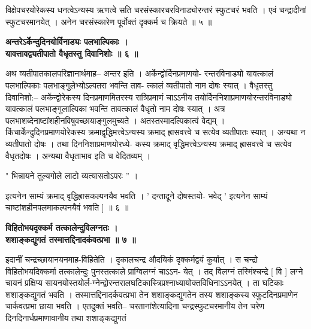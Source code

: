 \documentclass[11pt, openany]{book}
\begin{document}
{{{{\newpage
\thispagestyle{fancy}
\fancyhf{}
\rhead{[संकीर्णाधिकारः]}
\justifying
\noindent
विक्षेपचरयोरेकस्य धनत्वेऽन्यस्य ऋणत्वे सति चरसंस्कारचरविनाड्योरन्तरं
स्फुटचरं
भवति । एवं चन्द्रादीनां स्फुटचरमानयेत् । अनेन चरसंस्कारेण
पूर्वोक्तं
दृक्कर्म च क्रियते ॥ ५ ॥

\vspace{2mm}
\centering
\hspace{-0.7cm}
\textbf{
 अन्तरेऽर्केन्दुदिनयोर्विनाड्यः पलभाल्पिकाः ।\\
 यावत्तावद्व्यतीपातो वैधृतस्तु दिवानिशोः ॥ ६ ॥}
 
\vspace{2mm}
\justifying
 अथ व्यतीपातकालपरिज्ञानार्थमाह-- अन्तर इति ।
अर्केन्द्वोर्दिनप्रमाणयो-
रन्तरविनाड्यो यावत्कालं पलभाल्पिकाः पलभाङ्गुलेभ्योऽल्पतरा भवन्ति ताव-
त्कालं व्यतीपातो नाम दोषः स्यात् । वैधृतस्तु दिवानिशो:--
अर्केन्द्वोरेकस्य
दिनप्रमाणमितरस्य रात्रिप्रमाणं चाऽऽनीय
तयोर्दिननिशाप्रमाणयोरन्तरविनाड्यो
यावत्कालं पलभाङ्गुलाल्पिका भवन्ति तावत्कालं वैधृतो नाम दोषः स्यात् ।
अत्र पलभाशब्देनाष्टांशहीनविषुवच्छायाङ्गुलमुच्यते ।
अतस्तस्मादल्पिकात्वं वेद्यम् ।
किंचार्केन्दुदिनप्रमाणयोरेकस्य क्रमाद्वृद्धिमत्त्वेऽन्यस्य क्रमाद्
ह्रासवत्त्वे च सत्येव
व्यतीपातः स्यात् । अन्यथा न व्यतीपातो दोषः । तथा
दिननिशाप्रमाणयोरध्ये-
कस्य क्रमाद् वृद्धिमत्त्वेऽन्यस्य क्रमाद् ह्रासवत्त्वे च सत्येव
वैधृतदोषः । अन्यथा
वैधृताभाव इति च वेदितव्यम् ।

\vspace{2mm}
\centering
 " भिन्नायने तुल्यगोले लाटो व्यत्यासतोऽपरः '' ।

\vspace{2mm}
\justifying
 इत्यनेन साम्यं क्रमाद् वृद्धिह्रासकल्पनयैव भवति । ' दन्तादूने
दोषस्तयो-
भवेद् ' इत्यनेन साम्यं चाष्टांशहीनपलमाकल्पनयैवं भवति ] ॥ ६ ॥

\vspace{2mm}
\centering
\hspace{-0.9cm}
\textbf{
 विहितोभयदृक्कर्म तत्कालेन्दुविलग्नतः ।\\
 शशाङ्कद्युगतं तस्मात्तद्दिनादकंवत्प्रभा ॥ ७ ॥}

\vspace{2mm}
\justifying
 इदानीं चन्द्रच्छायानयनमाह-विहितेति । दृकालचन्द्र औदयिकं
दृक्कर्मद्वयं
कुर्यात् । स चन्द्रो विहितोभयदिक्कर्मा तत्कालेन्दुः पुनस्तत्काले
प्राग्विलग्नं चाऽऽन-
येत् । तद् विलग्नं तस्मिंश्चन्द्रे [ वि ] लग्ने चायनं प्रक्षिप्य
सायनयोस्तयोर्ल-ग्नेन्द्वोरन्तरालघटिकास्त्रिप्रश्नाध्यायोक्तविधिनाऽऽनयेत् । ता घटिकाः
शशाङ्कद्युगतं
भवति । तस्मात्तद्दिनादर्कवत्प्रभा तेन शशाङ्कद्युगतेन तस्य
शशाङ्कस्य
स्फुटदिनप्रमाणेन चार्कवत्प्रभा छाया भवति । एतदुक्तं भवति--
चरतानांशेत्यादिना
चन्द्रस्फुटचरमानीय तेन चरेण दिनदिनार्धप्रमाणावानीय तथा शशाङ्कद्युगतं

}}}}
\end{document}
